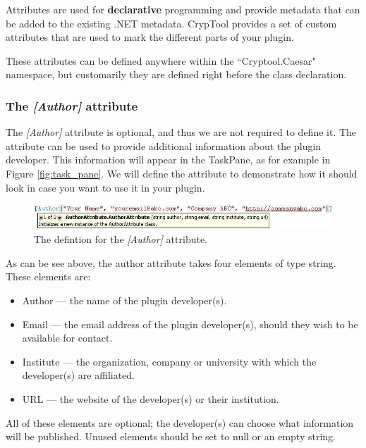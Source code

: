 Attributes are used for \textbf{declarative} programming and provide metadata that can be added to the existing .NET metadata. CrypTool provides a set of custom attributes that are used to mark the different parts of your plugin.

These attributes can be defined anywhere within the ``Cryptool.Caesar" namespace, but customarily they are defined right before the class declaration.

\subsubsection*{The \textit{[Author]} attribute}
\label{sec:TheAuthorAttribute}

The \textit{[Author]} attribute is optional, and thus we are not required to define it. The attribute can be used to provide additional information about the plugin developer. This information will appear in the TaskPane, as for example in Figure \ref{fig:task_pane}. We will define the attribute to demonstrate how it should look in case you want to use it in your plugin.

\begin{figure}[h!]
	\centering
		\includegraphics[width=.90\textwidth]{figures/attribute_author_new.jpg}
	\caption{The defintion for the \textit{[Author]} attribute.}
	\label{fig:attribute_author}
\end{figure}

As can be see above, the author attribute takes four elements of type string. These elements are:

\begin{itemize}
	\item Author --- the name of the plugin developer(s).
	\item Email --- the email address of the plugin developer(s), should they wish to be available for contact.
	\item Institute --- the organization, company or university with which the developer(s) are affiliated.
	\item URL --- the website of the developer(s) or their institution.
\end{itemize}

All of these elements are optional; the developer(s) can choose what information will be published. Unused elements should be set to null or an empty string.
\clearpage

